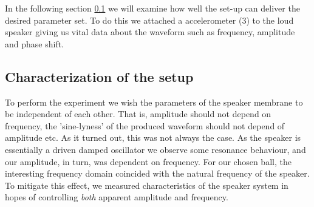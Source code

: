 \documentclass[12pt,oneside,a4paper]{article}
\numberwithin{equation}{section}
\begin{document}
{{{{In the following section \ref{Characterization} we will examine how well the set-up can deliver the desired parameter set. To do this we attached a accelerometer (3) to the loud speaker giving us vital data about the waveform such as frequency, amplitude and phase shift.
\subsection{Characterization of the setup}
\label{Characterization}
To perform the experiment we wish the parameters of the speaker membrane to be independent of each other. That is, amplitude should not depend on frequency, the 'sine-lyness' of the produced waveform should not depend of amplitude etc. As it turned out, this was not always the case. As the speaker is essentially a driven damped oscillator we observe some resonance behaviour, and our amplitude, in turn, was dependent on frequency. For our chosen ball, the interesting frequency domain coincided with the natural frequency of the speaker. To mitigate this effect, we measured characteristics of the speaker system in hopes of controlling \emph{both} apparent amplitude and frequency.  

}}}}
\end{document}
